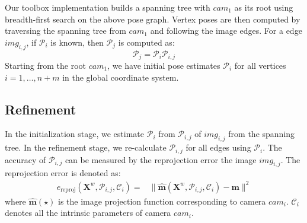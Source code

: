\documentclass{report}
\begin{document}
Our toolbox implementation builds a spanning tree with $cam_1$ as its root using breadth-first search on the above pose graph. Vertex poses are then computed by traversing the spanning tree from $cam_1$ and following the image edges. For a edge $img_{i, j}$, if $\mathcal{P}_i$ is known, then $\mathcal{P}_j$ is computed as: 
\begin{equation}
\mathcal{P}_j = \mathcal{P}_i \mathcal{P}_{i, j}
\end{equation} 
Starting from the root $cam_1$, we have initial pose estimates $\mathcal{P}_i$ for all vertices $i = 1, \dots, n + m$ in the global coordinate system.

\subsection{Refinement}
In the initialization stage, we estimate $\mathcal{P}_i$ from $\mathcal{P}_{i, j}$ of $img_{i, j}$ from the spanning tree. In the refinement stage, we re-calculate $\mathcal{P}_{i, j}$ for all edges using $\mathcal{P}_i$. The accuracy of $\mathcal{P}_{i, j}$ can be measured by the reprojection error the image $img_{i, j}$. The reprojection error is denoted as: 
\begin{equation}
\begin{split}
e_{\textrm{reproj}}(\mathbf{X}^w, \mathcal{P}_{i, j}, \mathcal{C}_i) =& \|\hat{\mathbf{m}}(\mathbf{X}^w, \mathcal{P}_{i, j}, \mathcal{C}_i) - \mathbf{m}\|^2 
\end{split}
\end{equation}
where $\hat{\mathbf{m}}(\star)$ is the image projection function corresponding to camera $cam_i$. $\mathcal{C}_i$ denotes all the intrinsic parameters of camera $cam_i$. 
\end{document}
